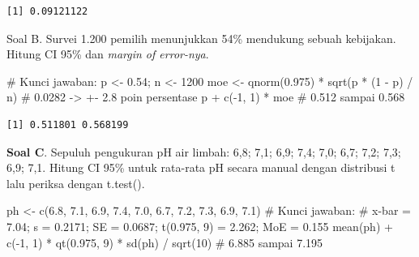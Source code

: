 \documentclass[
  indonesian,
  letterpaper,
]{book}
\newenvironment{Shaded}{\begin{snugshade}}{\end{snugshade}}
\newcommand{\CommentTok}[1]{\textcolor[rgb]{0.37,0.37,0.37}{#1}}
\newcommand{\DecValTok}[1]{\textcolor[rgb]{0.68,0.00,0.00}{#1}}
\newcommand{\FloatTok}[1]{\textcolor[rgb]{0.68,0.00,0.00}{#1}}
\newcommand{\FunctionTok}[1]{\textcolor[rgb]{0.28,0.35,0.67}{#1}}
\newcommand{\NormalTok}[1]{\textcolor[rgb]{0.00,0.23,0.31}{#1}}
\newcommand{\OtherTok}[1]{\textcolor[rgb]{0.00,0.23,0.31}{#1}}
\newcommand{\SpecialCharTok}[1]{\textcolor[rgb]{0.37,0.37,0.37}{#1}}
\begin{document}
\begin{verbatim}
[1] 0.09121122
\end{verbatim}

Soal B. Survei 1.200 pemilih menunjukkan 54\% mendukung sebuah
kebijakan. Hitung CI 95\% dan \emph{margin of error-nya}.

\begin{Shaded}
\begin{Highlighting}[]
\CommentTok{\# Kunci jawaban:}
\NormalTok{p }\OtherTok{\textless{}{-}} \FloatTok{0.54}\NormalTok{; n }\OtherTok{\textless{}{-}} \DecValTok{1200}
\NormalTok{moe }\OtherTok{\textless{}{-}} \FunctionTok{qnorm}\NormalTok{(}\FloatTok{0.975}\NormalTok{) }\SpecialCharTok{*} \FunctionTok{sqrt}\NormalTok{(p }\SpecialCharTok{*}\NormalTok{ (}\DecValTok{1} \SpecialCharTok{{-}}\NormalTok{ p) }\SpecialCharTok{/}\NormalTok{ n) }\CommentTok{\# 0.0282 {-}\textgreater{} +{-} 2.8 poin persentase}
\NormalTok{p }\SpecialCharTok{+} \FunctionTok{c}\NormalTok{(}\SpecialCharTok{{-}}\DecValTok{1}\NormalTok{, }\DecValTok{1}\NormalTok{) }\SpecialCharTok{*}\NormalTok{ moe }\CommentTok{\# 0.512 sampai 0.568}
\end{Highlighting}
\end{Shaded}

\begin{verbatim}
[1] 0.511801 0.568199
\end{verbatim}

\textbf{Soal C}. Sepuluh pengukuran pH air limbah: 6,8; 7,1; 6,9; 7,4;
7,0; 6,7; 7,2; 7,3; 6,9; 7,1. Hitung CI 95\% untuk rata-rata pH secara
manual dengan distribusi t lalu periksa dengan t.test().

\begin{Shaded}
\begin{Highlighting}[]
\NormalTok{ph }\OtherTok{\textless{}{-}} \FunctionTok{c}\NormalTok{(}\FloatTok{6.8}\NormalTok{, }\FloatTok{7.1}\NormalTok{, }\FloatTok{6.9}\NormalTok{, }\FloatTok{7.4}\NormalTok{, }\FloatTok{7.0}\NormalTok{, }\FloatTok{6.7}\NormalTok{, }\FloatTok{7.2}\NormalTok{, }\FloatTok{7.3}\NormalTok{, }\FloatTok{6.9}\NormalTok{, }\FloatTok{7.1}\NormalTok{)}
\CommentTok{\# Kunci jawaban:}
\CommentTok{\# x{-}bar = 7.04; s = 0.2171; SE = 0.0687; t(0.975, 9) = 2.262; MoE = 0.155}
\FunctionTok{mean}\NormalTok{(ph) }\SpecialCharTok{+} \FunctionTok{c}\NormalTok{(}\SpecialCharTok{{-}}\DecValTok{1}\NormalTok{, }\DecValTok{1}\NormalTok{) }\SpecialCharTok{*} \FunctionTok{qt}\NormalTok{(}\FloatTok{0.975}\NormalTok{, }\DecValTok{9}\NormalTok{) }\SpecialCharTok{*} \FunctionTok{sd}\NormalTok{(ph) }\SpecialCharTok{/} \FunctionTok{sqrt}\NormalTok{(}\DecValTok{10}\NormalTok{) }\CommentTok{\# 6.885 sampai 7.195}
\end{Highlighting}
\end{Shaded}
\end{document}

